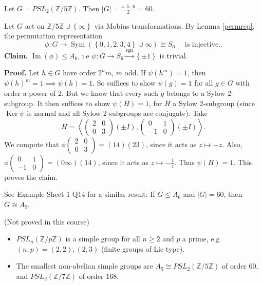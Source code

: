 \documentclass[a4paper]{scrartcl}
\begin{document}
\begin{example*}
      Let $G=PSL_2 (\mathbb{Z}/5\mathbb{Z})$. Then $|G|= \frac{4 \cdot 5 \cdot  6}{2}=60$. 
      
      Let $G$ act on $\mathbb{Z}/5\mathbb{Z} \cup \left\{ \infty\right\}$ via Mobius transformations. By Lemma \ref{permrep}, the permutation representation \[
      \phi: G \rightarrow \operatorname{Sym}(\left\{0,1,2,3,4\right\}\cup \infty) \cong S_{6} \quad  \text{ is injective.}
      .\]
      \textbf{Claim.} $\operatorname{Im} (\phi) \leq A_6 $, i.e $\psi: G \rightarrow S_6 \xrightarrow{\operatorname{sgn}} \left\{\pm 1\right\}$ is trivial. 
      
      \textbf{Proof.} Let $h \in G$ have order $2^{n}m$, $m$ odd. If $\psi (h^{m})=1$, then $\psi (h)^{m}=1 \implies \psi (h)=1$. So suffices to show $\psi (g)=1$ for all $g \in G$ with order a power of 2. But we know that every such $g$ belongs to a Sylow 2-subgroup. It then suffices to show $\psi (H)=1$, for $H$ a Sylow 2-subgroup (since $\operatorname{Ker} \psi$ is normal and all Sylow 2-subgroups are conjugate). Take \[
          H=\left\langle \begin{pmatrix} 2&0\\0&3 \end{pmatrix}(\pm I),\begin{pmatrix} 0&1\\-1&0 \end{pmatrix} (\pm I)\right\rangle
      .\] We compute that $\phi \begin{pmatrix} 2&0\\0&3 \end{pmatrix}= (14)(23)$, since it acts as $z \mapsto -z$. Also, $\phi \begin{pmatrix} 0&1\\-1&0 \end{pmatrix}= (0 \infty)(14)$, since it acts as $z \mapsto -\frac{1}{z}$. Thus $\psi (H)=1$. This proves the claim. 

      See Example Sheet 1 Q14 for a similar result: If $G \leq A_6 $ and $|
      G|=60$, then $G \cong A_5 $.
\end{example*}
\begin{remarks}
      (Not proved in this course)\hfill 
      \begin{itemize}
           \item $PSL_n (\mathbb{Z}/p\mathbb{Z})$ is a simple group for all $n \geq 2$ and $p$ a prime, e.g $(n,p)=(2,2), (2,3)$ (finite groups of Lie type). 
           \item The smallest non-abelian simple groups are $A_5 \cong PSL_2 (\mathbb{Z}/5\mathbb{Z})$ of order 60, and $PSL_2 (\mathbb{Z}/7\mathbb{Z})$ of order 168.
      \end{itemize}
\end{remarks}
\end{document}
